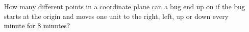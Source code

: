 How many different points in a coordinate plane can a bug end up on if the bug starts at the origin and moves one unit to the right, left, up or down every minute for $8$ minutes?
